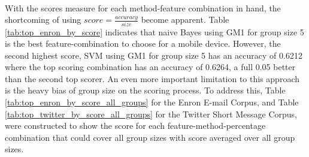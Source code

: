 \paragraph{} With the scores measure for each method-feature combination in hand, the shortcoming of using $score = \frac{accuracy}{size}$ become apparent.  Table \ref{tab:top_enron_by_score} indicates that naive Bayes using GM1 for group size 5 is the best feature-combination to choose for a mobile device.  However, the second highest score, SVM using GM1 for group size 5 has an accuracy of 0.6212 where the top scoring combination has an accuracy of 0.6264, a full 0.05 better than the second top scorer.  An even more important limitation to this approach is the heavy bias of group size on the scoring process.  To address this, Table \ref{tab:top_enron_by_score_all_groups} for the Enron E-mail Corpus, and Table \ref{tab:top_twitter_by_score_all_groups} for the Twitter Short Message Corpus, were constructed to show the score for each feature-method-percentage combination that could cover all group sizes with score averaged over all group sizes.

